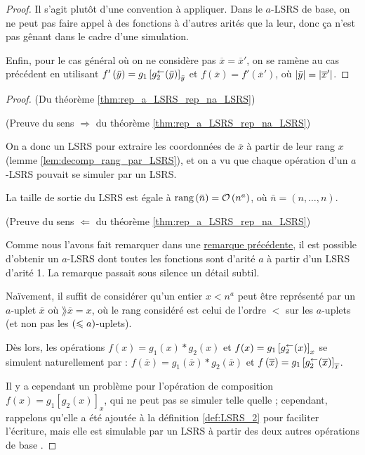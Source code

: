 \begin{proof}
		Il s'agit plutôt d'une convention à appliquer. Dans le $a$-LSRS de base, on ne peut pas faire appel à des fonctions à d'autres arités que la leur, donc ça n'est pas gênant dans le cadre d'une simulation.
		

		
		Enfin, pour le cas général où on ne considère pas $\overline{x} = \overline{x}'$, on se ramène au cas précédent en utilisant $f'\left( \bar{y} \right) = g_1\left[ g_2^{\leftarrow}(\bar{y}) \right]_{\bar{y}}$ et $f\left( \overline{x} \right) = f'\left( \overline{x}' \right)$, où $\left|\bar{y}\right| = \left|\overline{x}'\right|$.
		
	\end{proof}
	
	
	\begin{proof} (Du théorème \ref{thm:rep_a_LSRS_rep_na_LSRS})
		
		(Preuve du sens $\Rightarrow$ du théorème \ref{thm:rep_a_LSRS_rep_na_LSRS})
		
		On a donc un LSRS pour extraire les coordonnées de $\overline{x}$ à partir de leur rang $x$ (lemme \ref{lem:decomp_rang_par_LSRS}), et on a vu que chaque opération d'un $a$-LSRS pouvait se simuler par un LSRS.
		
		La taille de sortie du LSRS est égale à $\text{rang}\left( \bar{n} \right) = \mathcal{O}\left( n ^a \right)$, où $\bar{n} = \left( n, \dots, n\right)$.
		
		\espace
		
		(Preuve du sens $\Leftarrow$ du théorème \ref{thm:rep_a_LSRS_rep_na_LSRS})
		
		Comme nous l'avons fait remarquer dans une \hyperref[rmq:choix_arites]{remarque précédente}, il est possible d'obtenir un $a$-LSRS dont toutes les fonctions sont d'arité $a$ à partir d'un LSRS d'arité 1. La remarque passait sous silence un détail subtil.
		
		Naïvement, il suffit de considérer qu'un entier $x < n^a$ peut être représenté par un $a$-uplet $\overline{x}$ où $\rang{\overline{x}} = x$, où le rang considéré est celui de l'ordre $<$ sur les $a$-uplets (et non pas les $\left( \leqslant a \right)$-uplets).
		
		Dès lors, les opérations $f(x) = g_1(x) * g_2(x)$ et $f(x) = g_1\left[ g_2^{\leftarrow}(x) \right]_{x}$ se simulent naturellement par : $f\left(\overline{x}\right) = g_1\left(\overline{x}\right) * g_2\left(\overline{x}\right)$ et $f\left(\overline{x}\right) = g_1\left[ g_2^{\leftarrow}(\overline{x}) \right]_{\overline{x}}$.
		
		Il y a cependant un problème pour l'opération de composition $f(x) = g_1\left[g_2(x)\right]_x$, qui ne peut pas se simuler telle quelle ; cependant, rappelons qu'elle a été ajoutée à la définition \ref{def:LSRS_2} pour faciliter l'écriture, mais elle est simulable par un LSRS à partir des deux autres opérations de base \cite{GrandjeanSchwentick2002}.
	\end{proof}
	
